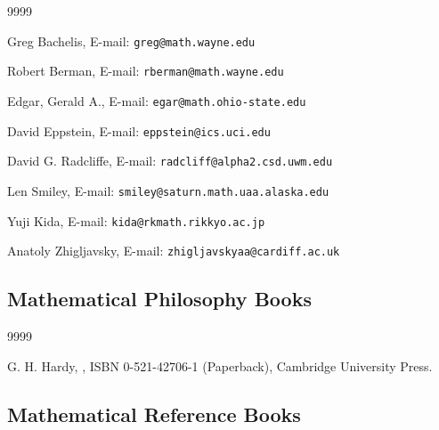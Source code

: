 \begin{thecustombibliography}{9999}

Greg Bachelis,
E-mail: \texttt{greg@math.wayne.edu}

Robert Berman,
E-mail: \texttt{rberman@math.wayne.edu}

Edgar, Gerald A.,
E-mail: \texttt{egar@math.ohio-state.edu}

David Eppstein,
E-mail: \texttt{eppstein@ics.uci.edu}

David G. Radcliffe,
E-mail: \texttt{radcliff@alpha2.csd.uwm.edu}

Len Smiley,
E-mail: \texttt{smiley@saturn.math.uaa.alaska.edu}

Yuji Kida,
E-mail: \texttt{kida@rkmath.rikkyo.ac.jp}

Anatoly Zhigljavsky,
E-mail: \texttt{zhigljavskyaa@cardiff.ac.uk}

\end{thecustombibliography}




\subsection*{Mathematical Philosophy Books}

\begin{thecustombibliography}{9999}

G. H. Hardy,
, ISBN 0-521-42706-1 (Paperback),
Cambridge University Press.

\end{thecustombibliography}


\subsection*{Mathematical Reference Books}

